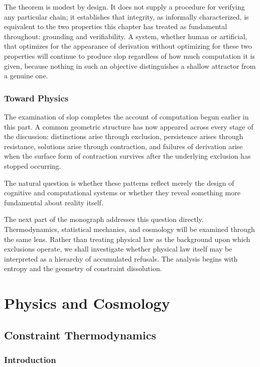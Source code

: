\documentclass[11pt,oneside]{book}
\theoremstyle{plain}
\theoremstyle{definition}
\theoremstyle{remark}
\begin{document}
The theorem is modest by design. It does not supply a procedure for verifying any particular chain; it establishes that integrity, as informally characterized, is equivalent to the two properties this chapter has treated as fundamental throughout: grounding and verifiability. A system, whether human or artificial, that optimizes for the appearance of derivation without optimizing for these two properties will continue to produce slop regardless of how much computation it is given, because nothing in such an objective distinguishes a shallow attractor from a genuine one.

\section{Toward Physics}

The examination of slop completes the account of computation begun earlier in this part. A common geometric structure has now appeared across every stage of the discussion: distinctions arise through exclusion, persistence arises through resistance, solutions arise through contraction, and failures of derivation arise when the surface form of contraction survives after the underlying exclusion has stopped occurring.

The natural question is whether these patterns reflect merely the design of cognitive and computational systems or whether they reveal something more fundamental about reality itself.

The next part of the monograph addresses this question directly. Thermodynamics, statistical mechanics, and cosmology will be examined through the same lens. Rather than treating physical law as the background upon which exclusions operate, we shall investigate whether physical law itself may be interpreted as a hierarchy of accumulated refusals. The analysis begins with entropy and the geometry of constraint dissolution.

\part{Physics and Cosmology}

\chapter{Constraint Thermodynamics}

\section{Introduction}
\end{document}
